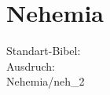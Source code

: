 \section{Nehemia}
        Standart-Bibel: \getdefault \\
        Ausdruch: \getversions \\        
          {Nehemia/neh_2} 

